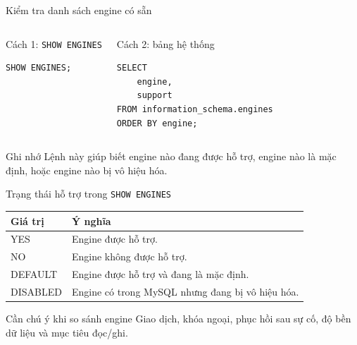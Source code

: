 \documentclass[aspectratio=169,11pt]{beamer}
\newcommand{\code}[1]{\texttt{#1}}
\begin{document}
\begin{frame}[fragile]{Kiểm tra danh sách engine có sẵn}
\begin{columns}[T,onlytextwidth]
\begin{block}{Cách 1: \code{SHOW ENGINES}}
\begin{lstlisting}
SHOW ENGINES;
\end{lstlisting}
\end{block}
\begin{block}{Cách 2: bảng hệ thống}
\begin{lstlisting}
SELECT
    engine,
    support
FROM information_schema.engines
ORDER BY engine;
\end{lstlisting}
\end{block}
\end{columns}
\vspace{0.25cm}
\begin{alertblock}{Ghi nhớ}
Lệnh này giúp biết engine nào đang được hỗ trợ, engine nào là mặc định, hoặc engine nào bị vô hiệu hóa.
\end{alertblock}
\end{frame}

\begin{frame}{Trạng thái hỗ trợ trong \code{SHOW ENGINES}}
\begin{center}
\begin{tabularx}{0.88\textwidth}{>{\ttfamily}l X}
\toprule
\textbf{Giá trị} & \textbf{Ý nghĩa} \\
\midrule
YES & Engine được hỗ trợ. \\
NO & Engine không được hỗ trợ. \\
DEFAULT & Engine được hỗ trợ và đang là mặc định. \\
DISABLED & Engine có trong MySQL nhưng đang bị vô hiệu hóa. \\
\bottomrule
\end{tabularx}
\end{center}
\begin{block}{Cần chú ý khi so sánh engine}
Giao dịch, khóa ngoại, phục hồi sau sự cố, độ bền dữ liệu và mục tiêu đọc/ghi.
\end{block}
\end{frame}
\end{document}
